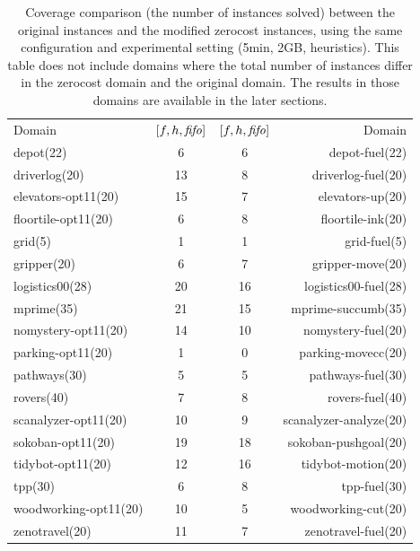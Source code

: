 \begin{table}[htbp]
 \centering
\begin{tabular}{|lc|cr|}
Domain & \([f,h,{\mbox{\textit{fifo}}}]\) & \([f,h,{\mbox{\textit{fifo}}}]\) & Domain\\
depot(22) & 6 & 6 & depot-fuel(22)\\
driverlog(20) & 13 & 8 & driverlog-fuel(20)\\
elevators-opt11(20) & 15 & 7 & elevators-up(20)\\
floortile-opt11(20) & 6 & 8 & floortile-ink(20)\\
grid(5) & 1 & 1 & grid-fuel(5)\\
gripper(20) & 6 & 7 & gripper-move(20)\\
logistics00(28) & 20 & 16 & logistics00-fuel(28)\\
mprime(35) & 21 & 15 & mprime-succumb(35)\\
nomystery-opt11(20) & 14 & 10 & nomystery-fuel(20)\\
parking-opt11(20) & 1 & 0 & parking-movecc(20)\\
pathways(30) & 5 & 5 & pathways-fuel(30)\\
rovers(40) & 7 & 8 & rovers-fuel(40)\\
scanalyzer-opt11(20) & 10 & 9 & scanalyzer-analyze(20)\\
sokoban-opt11(20) & 19 & 18 & sokoban-pushgoal(20)\\
tidybot-opt11(20) & 12 & 16 & tidybot-motion(20)\\
tpp(30) & 6 & 8 & tpp-fuel(30)\\
woodworking-opt11(20) & 10 & 5 & woodworking-cut(20)\\
zenotravel(20) & 11 & 7 & zenotravel-fuel(20)\\
\end{tabular}
 \caption{
 Coverage comparison (the number of instances solved) 
 between the original instances and the modified zerocost instances,
 using the same configuration and experimental setting (5min, 2GB, \lmcut heuristics).
 This table does not include domains where the total number of instances
 differ in the zerocost domain and the original domain. The results in
 those domains are available in the later sections.
 }
 \label{tbl:lmcut-zerocost-std}
\end{table}

